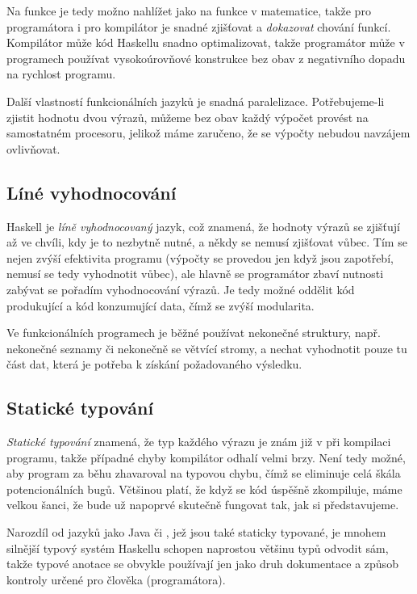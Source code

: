 Na funkce je tedy možno nahlížet jako na funkce v matematice, takže pro
programátora i pro kompilátor je snadné zjišťovat a \emph{dokazovat} chování
funkcí. Kompilátor může kód Haskellu snadno optimalizovat, takže programátor
může v programech používat vysokoúrovňové konstrukce bez obav z negativního
dopadu na rychlost programu.

Další vlastností funkcionálních jazyků je snadná paralelizace. Potřebujeme-li
zjistit hodnotu dvou výrazů, můžeme bez obav každý výpočet provést na
samostatném procesoru, jelikož máme zaručeno, že se výpočty nebudou navzájem
ovlivňovat.

\subsection{Líné vyhodnocování}

Haskell je \emph{líně vyhodnocovaný} jazyk, což znamená, že hodnoty výrazů se
zjišťují až ve chvíli, kdy je to nezbytně nutné, a někdy se nemusí zjišťovat
vůbec. Tím se nejen zvýší efektivita programu (výpočty se provedou jen když jsou
zapotřebí, nemusí se tedy vyhodnotit vůbec), ale hlavně se programátor zbaví
nutnosti zabývat se pořadím vyhodnocování výrazů. Je tedy možné oddělit kód
produkující a kód konzumující data, čímž se zvýší modularita. \cite{hughes1989functional}

Ve funkcionálních programech je běžné používat nekonečné struktury, např.
nekonečné seznamy či nekonečně se větvící stromy, a nechat vyhodnotit pouze tu
část dat, která je potřeba k získání požadovaného výsledku.

\subsection{Statické typování}

\emph{Statické typování} znamená, že typ každého výrazu je znám již v při
kompilaci programu, takže případné chyby kompilátor odhalí velmi brzy. Není tedy
možné, aby program za běhu zhavaroval na typovou chybu, čímž se eliminuje celá
škála potencionálních bugů. Většinou platí, že když se kód úspěšně zkompiluje,
máme velkou šanci, že bude už napoprvé skutečně fungovat tak, jak si
představujeme.

Narozdíl od jazyků jako Java či \Cplusplus, jež jsou také staticky typované, je
mnohem silnější typový systém Haskellu schopen naprostou většinu typů odvodit
sám, takže typové anotace se obvykle používají jen jako druh dokumentace a
způsob kontroly určené pro člověka (programátora).

